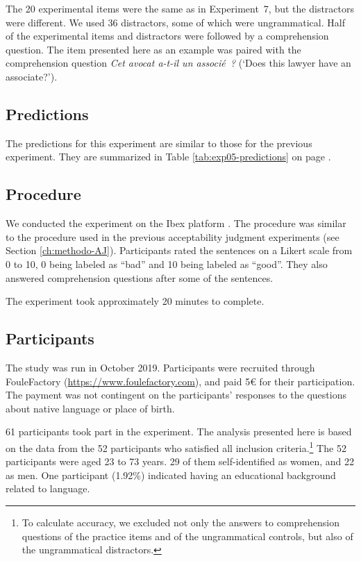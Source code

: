 The 20 experimental items were the same as in Experiment~7, but the distractors were different. We used 36 distractors, some of which were ungrammatical. Half of the experimental items and distractors were followed by a comprehension question. The item presented here as an example was paired with the comprehension question \emph{Cet avocat a-t-il un associé~?} (`Does this lawyer have an associate?'). 

\subsection{Predictions}

The predictions for this experiment are similar to those for the previous experiment. They are summarized in Table \ref{tab:exp05-predictions} on page \pageref{tab:exp05-predictions}.

\subsection{Procedure} 

We conducted the experiment on the Ibex platform \citep{Ibex}. The procedure was similar to the procedure used in the previous acceptability judgment experiments (see Section \ref{ch:methodo-AJ}). Participants rated the sentences on a Likert scale from 0 to 10, 0 being labeled as ``bad'' and 10 being labeled as ``good''. They also answered comprehension questions after some of the sentences.

The experiment took approximately 20 minutes to complete.

\subsection{Participants}

The study was run in October 2019.  
Participants were recruited through FouleFactory (\url{https://www.foulefactory.com}), and paid 5€ for their participation. The payment was not contingent on the participants' responses to the questions about native language or place of birth.

61 participants took part in the experiment. The analysis presented here is based on the data from the 52 participants who satisfied all inclusion criteria.\footnote{To calculate accuracy, we excluded not only the answers to comprehension questions of the practice items and of the ungrammatical controls, but also of the ungrammatical distractors.}
The 52 participants were aged 23 to 73 years. 29 of them self-identified as women, and 22 as men. One participant (1.92\%) indicated having an educational background related to language.

